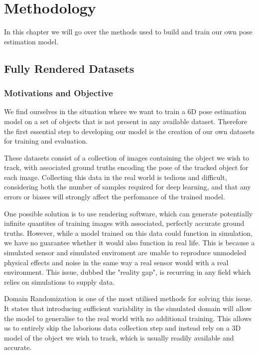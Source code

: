 \chapter{Methodology}

In this chapter we will go over the methods used to build and train our own pose estimation model.

\section{Fully Rendered Datasets}

\subsection{Motivations and Objective}

We find ourselves in the situation where we want to train a 6D pose estimation model on a set of objects that is not present in any available dataset. Therefore the first essential step to developing our model is the creation of our own datasets for training and evaluation.

These datasets consist of a collection of images containing the object we wish to track, with associated ground truths encoding the pose of the tracked object for each image. Collecting this data in the real world is tedious and difficult, considering both the number of samples required for deep learning, and that any errors or biases will strongly affect the perfomance of the trained model. 

One possible solution is to use rendering software, which can generate potentially infinite quantites of training images with associated, perfectly accurate ground truths. However, while a model trained on this data could function in simulation, we have no guarantee whether it would also function in real life. This is because a simulated sensor and simulated enviroment are unable to reproduce unmodeled physical effects and noise in the same way a real sensor would with a real environment. This issue, dubbed the "reality gap"\cite{domainRandomization2}, is recurring in any field which relies on simulations to supply data.

Domain Randomization\cite{domainRandomization} is one of the most utilised methods for solving this issue. It states that introducing sufficient variability in the simulated domain will allow the model to generalise to the real world with no additional training. This allows us to entirely skip the laborious data collection step and instead rely on a 3D model of the object we wish to track, which is usually readily available and accurate.

